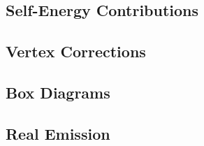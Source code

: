 \documentclass[../main.tex]{subfiles}
\begin{document}
\subsection{Self-Energy Contributions}

\begin{figure}
	\centering
	\caption{}
	\label{pc:fig:s_channel_se}
\end{figure}

\subsection{Vertex Corrections}

\subsection{Box Diagrams}

\subsection{Real Emission}
\end{document}
